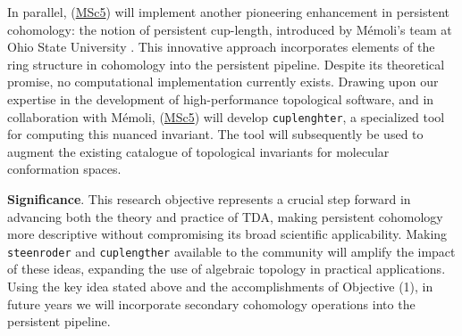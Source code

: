 \quad In parallel, (\underline{MSc5}) will implement another pioneering enhancement in persistent cohomology: the notion of persistent cup-length, introduced by M\'emoli's team at Ohio State University \cite{memoli2022cup_length}.
This innovative approach incorporates elements of the ring structure in cohomology into the persistent pipeline.
Despite its theoretical promise, no computational implementation currently exists.
Drawing upon our expertise in the development of high-performance topological software, and in collaboration with M\'emoli, (\underline{MSc5}) will develop \texttt{cuplenghter}, a specialized tool for computing this nuanced invariant.
The tool will subsequently be used to augment the existing catalogue of topological invariants for molecular conformation spaces.

\smallskip\textbf{Significance}.
This research objective represents a crucial step forward in advancing both the theory and practice of TDA, making persistent cohomology more descriptive without compromising its broad scientific applicability.
Making \texttt{steenroder} and \texttt{cuplengther} available to the community will amplify the impact of these ideas, expanding the use of algebraic topology in practical applications.
Using the key idea stated above and the accomplishments of Objective (1), in future years we will incorporate secondary cohomology operations into the persistent pipeline.